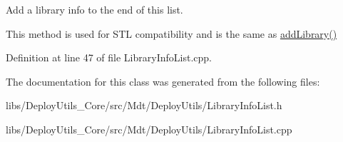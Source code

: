 Add a library info to the end of this list. 

This method is used for S\+TL compatibility and is the same as \hyperlink{class_mdt_1_1_deploy_utils_1_1_library_info_list_a2fd0bcb2c98ed5a9587e54d6496dac14}{add\+Library()} 

Definition at line 47 of file Library\+Info\+List.\+cpp.



The documentation for this class was generated from the following files\+:\begin{DoxyCompactItemize}
\item 
libs/\+Deploy\+Utils\+\_\+\+Core/src/\+Mdt/\+Deploy\+Utils/Library\+Info\+List.\+h\item 
libs/\+Deploy\+Utils\+\_\+\+Core/src/\+Mdt/\+Deploy\+Utils/Library\+Info\+List.\+cpp\end{DoxyCompactItemize}

